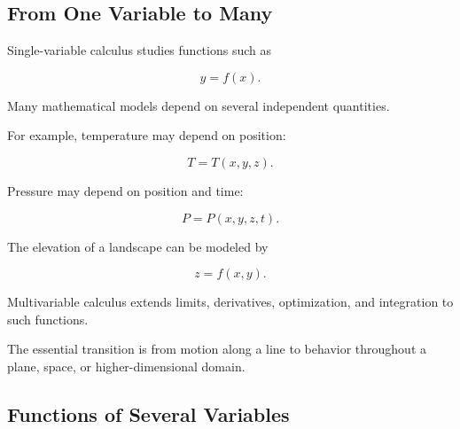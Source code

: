 \subsection{From One Variable to Many}
\label{subsec:from-one-to-many}

Single-variable calculus studies functions such as

\[ y=f(x). \]

Many mathematical models depend on several independent quantities.

For example, temperature may depend on position:

\[ T=T(x,y,z). \]

Pressure may depend on position and time:

\[ P=P(x,y,z,t). \]

The elevation of a landscape can be modeled by

\[ z=f(x,y). \]

Multivariable calculus extends limits, derivatives, optimization, and
integration to such functions.

\begin{conceptbox}
The essential transition is from motion along a line to behavior throughout
a plane, space, or higher-dimensional domain.
\end{conceptbox}

\begin{center}
\end{center}

\subsection{Functions of Several Variables}
\label{subsec:functions-several-variables}


